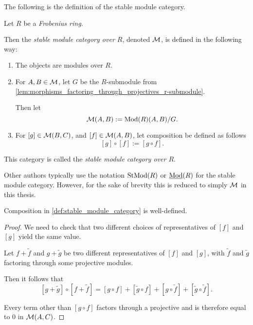 The following is the definition of the stable module category.
\begin{definition}
    \label{def:stable_module_category}
    Let \( R \) be a \emph{Frobenius ring}.

    Then the \emph{stable module category over \( R \)}, denoted \( {\mathcal{M}} \), is defined in the following way:
    \begin{enumerate}
        \item {
            The objects are modules over \( R \).
        }
        \item {
            For \( A, B \in {\mathcal{M}} \), let \( G \) be the \( R \)-submodule from \autoref{lem:morphisms_factoring_through_projectives_r-submodule}.
        
            Then let
            \[
                {\mathcal{M}}(A, B) := \operatorname{Mod}(R)(A, B)/G.
            \]
        }
        \item {
            For \( [g] \in {\mathcal{M}}(B, C) \), and \( [f] \in {\mathcal{M}}(A, B) \), let composition be defined as follows
            \[
                [g] \circ [f] := [g \circ f].
            \]
        }
    \end{enumerate}
    This category is called the \emph{stable module category over \( R \)}.
\end{definition}

Other authors typically use the notation \( \operatorname{StMod}(R) \) or \( \underline{\operatorname{Mod}}(R) \) for the stable module category. However, for the sake of brevity this is reduced to simply \( {\mathcal{M}} \) in this thesis.

\begin{lemma}
    Composition in \autoref{def:stable_module_category} is well-defined.
\end{lemma}
\begin{proof}
    We need to check that two different choices of representatives of \( [f] \) and \( [g] \) yield the same value.

    Let \( f + \widetilde{f} \) and \( g + \widetilde{g} \) be two different representatives of \( [f] \) and \( [g] \), with \( \widetilde{f} \) and \( \widetilde{g} \) factoring through some projective modules.

    Then it follows that
    \[
         [g + \widetilde{g}] \circ [f + \widetilde{f}] = [g \circ f] + [\widetilde{g} \circ f] + [g \circ \widetilde{f}] + [\widetilde{g} \circ \widetilde{f}].
    \]
    
    Every term other than \( [g \circ f] \) factors through a projective and is therefore equal to \( 0 \) in \( {\mathcal{M}}(A, C) \).
\end{proof}

